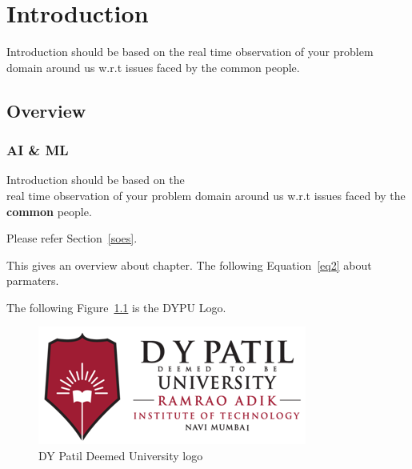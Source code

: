 \chapter{Introduction}
Introduction should be based on the real time observation of your problem domain around us w.r.t issues faced by the common people.

\section{Overview}\label{sec1}
\subsection{AI \& ML}\label{subsec1}


Introduction should be based on the \\ real time observation of your problem domain around us w.r.t issues faced by the \textbf{common} people.



Please refer Section~\ref{soes}.

\newpage

This gives an overview \cite{kunjir2017data} about chapter. The following Equation~\ref{eq2} about parmaters.

The following Figure~\ref{fig:rait-dypu-logo} is the DYPU Logo.

\begin{figure}[!htbp]
	\centering
		\includegraphics{rait-dypu-logo.png}
	\caption{DY Patil Deemed University logo}
	\label{fig:rait-dypu-logo}
\end{figure}






